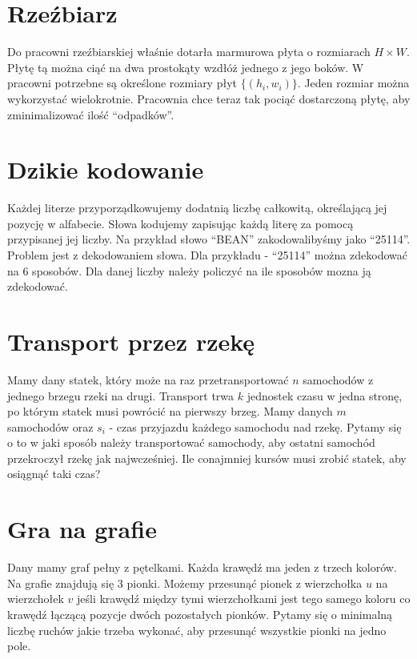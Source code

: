 \section*{Rzeźbiarz}

Do pracowni rzeźbiarskiej właśnie dotarła marmurowa płyta o rozmiarach $H \times W$.
Płytę tą można ciąć na dwa prostokąty wzdłóż jednego z jego boków.
W pracowni potrzebne są określone rozmiary płyt $\{ (h_i, w_i) \}$.
Jeden rozmiar można wykorzystać wielokrotnie.
Pracownia chce teraz tak pociąć dostarczoną płytę, aby zminimalizować ilość ``odpadków''.

\section*{Dzikie kodowanie}

Każdej literze przyporządkowujemy dodatnią liczbę całkowitą, określającą jej pozycję w alfabecie.
Słowa kodujemy zapisując każdą literę za pomocą przypisanej jej liczby.
Na przykład słowo ``BEAN'' zakodowalibyśmy jako ``25114''.
Problem jest z dekodowaniem słowa.
Dla przykładu - ``25114'' można zdekodować na $6$ sposobów.
Dla danej liczby należy policzyć na ile sposobów mozna ją zdekodować.

\section*{Transport przez rzekę}

Mamy dany statek, który może na raz przetransportować $n$ samochodów z jednego brzegu rzeki na drugi.
Transport trwa $k$ jednostek czasu w jedna stronę, po którym statek musi powrócić na pierwszy brzeg.
Mamy danych $m$ samochodów oraz $s_i$ - czas przyjazdu każdego samochodu nad rzekę.
Pytamy się o to w jaki sposób należy transportować samochody, aby ostatni samochód przekroczył rzekę jak najwcześniej.
Ile conajmniej kursów musi zrobić statek, aby osiągnąć taki czas?

\section*{Gra na grafie}

Dany mamy graf pełny z pętelkami.
Każda krawędź ma jeden z trzech kolorów.
Na grafie znajdują się $3$ pionki.
Możemy przesunąć pionek z wierzchołka $u$ na wierzchołek $v$ jeśli krawędź między tymi wierzchołkami jest tego samego koloru co krawędź łączącą pozycje dwóch pozostałych pionków.
Pytamy się o minimalną liczbę ruchów jakie trzeba wykonać, aby przesunąć wszystkie pionki na jedno pole.


